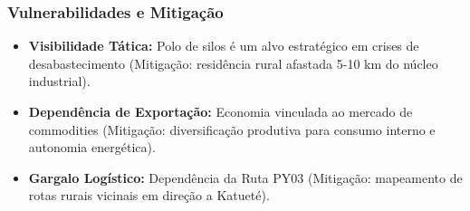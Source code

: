 \subsubsection{Vulnerabilidades e
Mitigação}

\begin{itemize}
\tightlist
\item
  \textbf{Visibilidade Tática:} Polo de silos é um alvo estratégico em
  crises de desabastecimento (Mitigação: residência rural afastada 5-10
  km do núcleo industrial).
\item
  \textbf{Dependência de Exportação:} Economia vinculada ao mercado de
  commodities (Mitigação: diversificação produtiva para consumo interno
  e autonomia energética).
\item
  \textbf{Gargalo Logístico:} Dependência da Ruta PY03 (Mitigação:
  mapeamento de rotas rurais vicinais em direção a Katueté).
\end{itemize}

